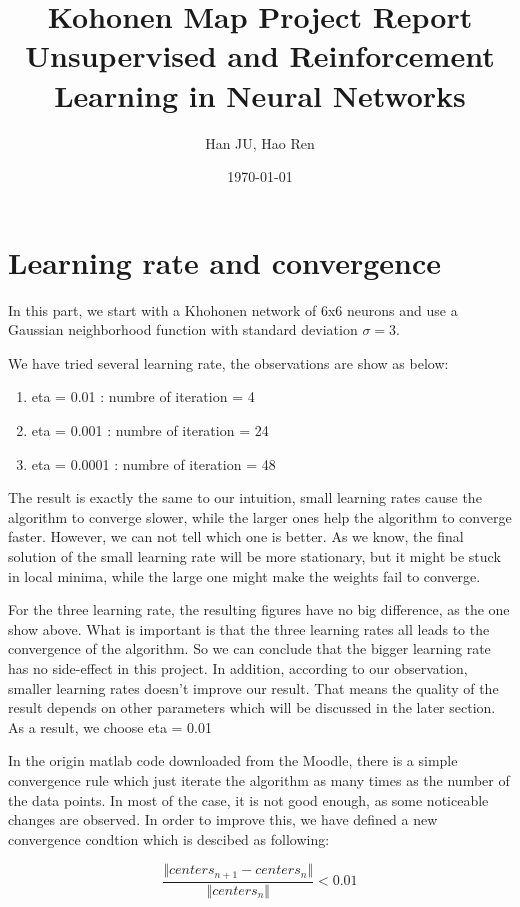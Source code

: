 \documentclass[a4paper, 12pt]{article}
\title{Kohonen Map Project Report \\ \vspace{0.5cm} \large Unsupervised and Reinforcement Learning in Neural Networks}
\author{Han JU, Hao Ren}
\date{\today}
\begin{document}
\maketitle

\section{Learning rate and convergence}
In this part, we start with a Khohonen network of 6x6 neurons and use a Gaussian neighborhood function with standard deviation $\sigma = 3$.

We have tried several learning rate, the observations are show as below:

\begin{enumerate}
\item eta = 0.01 : numbre of iteration = 4
\item eta = 0.001 : numbre of iteration = 24
\item eta = 0.0001 : numbre of iteration = 48
\end{enumerate}

The result is exactly the same to our intuition, small learning rates cause the algorithm to converge slower, while the larger ones help the algorithm to converge faster. However, we can not tell which one is better. As we know, the final solution of the small learning rate will be more stationary, but it might be stuck in local minima, while the large one might make the weights fail to converge.

For the three learning rate, the resulting figures have no big difference, as the one show above. What is important is that the three learning rates all leads to the convergence of the algorithm. So we can conclude that the bigger learning rate has no side-effect in this project. In addition, according to our observation, smaller learning rates doesn't improve our result. That means the quality of the result depends on other parameters which will be discussed in the later section. As a result, we choose eta = 0.01

In the origin matlab code downloaded from the Moodle, there is a
simple convergence rule which just iterate the algorithm as many times
as the number of the data points. In most of the case, it is not good enough, as some noticeable changes are observed. In order to improve this, we have defined a new convergence condtion which is descibed as following:

\begin{equation}
  \frac{\Vert centers_{n+1} - centers_n\Vert}{\Vert centers_n \Vert}
  < 0.01
\end{equation}
\end{document}

